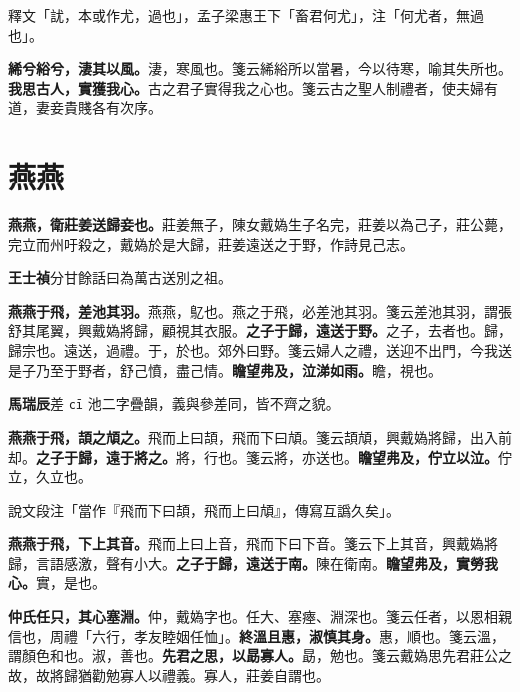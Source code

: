 \begin{quoting}釋文「訧，本或作尤，過也」，孟子梁惠王下「畜君何尤」，注「何尤者，無過也」。\end{quoting}

\textbf{絺兮綌兮，淒其以風。}{\footnotesize 淒，寒風也。箋云絺綌所以當暑，今以待寒，喻其失所也。}\textbf{我思古人，實獲我心。}{\footnotesize 古之君子實得我之心也。箋云古之聖人制禮者，使夫婦有道，妻妾貴賤各有次序。}

\section{燕燕}


\textbf{燕燕，衛莊姜送歸妾也。}{\footnotesize 莊姜無子，陳女戴媯生子名完，莊姜以為己子，莊公薨，完立而州吁殺之，戴媯於是大歸，莊姜遠送之于野，作詩見己志。}

\begin{quoting}\textbf{王士禎}分甘餘話曰為萬古送別之祖。\end{quoting}

\textbf{燕燕于飛，差池其羽。}{\footnotesize 燕燕，鳦也。燕之于飛，必差池其羽。箋云差池其羽，謂張舒其尾翼，興戴媯將歸，顧視其衣服。}\textbf{之子于歸，遠送于野。}{\footnotesize 之子，去者也。歸，歸宗也。遠送，過禮。于，於也。郊外曰野。箋云婦人之禮，送迎不出門，今我送是子乃至于野者，舒己憤，盡己情。}\textbf{瞻望弗及，泣涕如雨。}{\footnotesize 瞻，視也。}

\begin{quoting}\textbf{馬瑞辰}差 \texttt{cī} 池二字疊韻，義與參差同，皆不齊之貌。\end{quoting}

\textbf{燕燕于飛，頡之頏之。}{\footnotesize 飛而上曰頡，飛而下曰頏。箋云頡頏，興戴媯將歸，出入前却。}\textbf{之子于歸，遠于將之。}{\footnotesize 將，行也。箋云將，亦送也。}\textbf{瞻望弗及，佇立以泣。}{\footnotesize 佇立，久立也。}

\begin{quoting}說文段注「當作『飛而下曰頡，飛而上曰頏』，傳寫互譌久矣」。\end{quoting}

\textbf{燕燕于飛，下上其音。}{\footnotesize 飛而上曰上音，飛而下曰下音。箋云下上其音，興戴媯將歸，言語感激，聲有小大。}\textbf{之子于歸，遠送于南。}{\footnotesize 陳在衛南。}\textbf{瞻望弗及，實勞我心。}{\footnotesize 實，是也。}

\textbf{仲氏任只，其心塞淵。}{\footnotesize 仲，戴媯字也。任大、塞瘞、淵深也。箋云任者，以恩相親信也，周禮「六行，孝友睦姻任恤」。}\textbf{終溫且惠，淑慎其身。}{\footnotesize 惠，順也。箋云溫，謂顏色和也。淑，善也。}\textbf{先君之思，以勗寡人。}{\footnotesize 勗，勉也。箋云戴媯思先君莊公之故，故將歸猶勸勉寡人以禮義。寡人，莊姜自謂也。}

